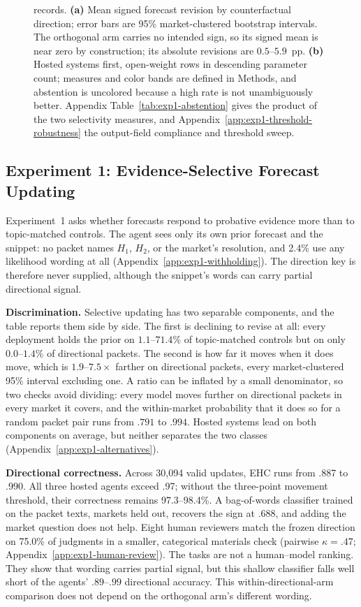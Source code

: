 \begin{figure}[!ht]
{{records.} \textbf{(a)} Mean signed forecast revision by counterfactual direction;
error bars are 95\% market-clustered bootstrap intervals. The orthogonal arm
carries no intended sign, so its signed mean is near zero by construction; its
absolute revisions are $0.5$--$5.9$~pp. \textbf{(b)} Hosted systems first,
open-weight rows in descending parameter count; measures and color bands are
defined in Methods, and abstention is uncolored because a high rate is not
unambiguously better. Appendix Table~\ref{tab:exp1-abstention} gives the product
of the two selectivity measures, and
Appendix~\ref{app:exp1-threshold-robustness} the output-field compliance and
threshold sweep.}
\label{fig:exp1-updating}
\end{figure}

\subsection{Experiment 1: Evidence-Selective Forecast Updating}
\label{sec:exp1}

Experiment~1 asks whether forecasts respond to probative evidence more than to
topic-matched controls. The agent sees only its own prior forecast and the
snippet: no packet names $H_1$, $H_2$, or the market's resolution, and 2.4\% use
any likelihood wording at all (Appendix~\ref{app:exp1-withholding}). The direction
key is therefore never supplied, although the snippet's words can carry partial
directional signal.

\textbf{Discrimination.} Selective updating has two separable components, and the
table reports them side by side. The first is declining to revise at all: every
deployment holds the prior on $1.1$--$71.4\%$ of topic-matched controls but on
only $0.0$--$1.4\%$ of directional packets. The second is how far it moves when it
does move, which is $1.9$--$7.5\times$ farther on directional packets, every
market-clustered 95\% interval excluding one. A ratio can be inflated by a small
denominator, so two checks avoid dividing: every model moves further on
directional packets in every market it covers, and the within-market probability
that it does so for a random packet pair runs from $.791$ to $.994$. Hosted
systems lead on both components on average, but neither separates the two classes
(Appendix~\ref{app:exp1-alternatives}).

\textbf{Directional correctness.} Across 30,094 valid updates, EHC runs from .887
to .990. All three hosted agents exceed .97; without the three-point movement
threshold, their correctness remains 97.3--98.4\%. A bag-of-words classifier trained on the packet
texts, markets held out, recovers the sign at $.688$, and adding the market
question does not help. Eight human reviewers match the frozen direction on
75.0\% of judgments in a smaller, categorical materials check (pairwise
$\kappa=.47$; Appendix~\ref{app:exp1-human-review}). The tasks are not a
human--model ranking. They show that wording carries partial signal, but this
shallow classifier falls well short of the agents' $.89$--$.99$ directional
accuracy. This within-directional-arm comparison does not depend on the
orthogonal arm's different wording.

